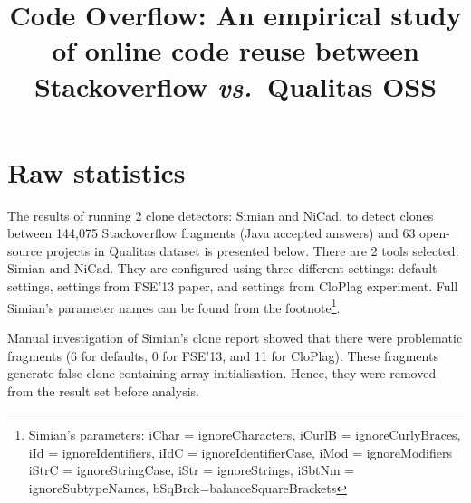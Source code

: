 \documentclass{IEEEtran}
\begin{document}
\onecolumn

\title{Code Overflow: An empirical study of online code reuse between Stackoverflow \textit{vs.~}Qualitas OSS}
\maketitle

\section*{Raw statistics}
The results of running 2 clone detectors: Simian and NiCad, to detect clones between 144,075 Stackoverflow fragments (Java accepted answers) and 63 open-source projects in Qualitas dataset is presented below. There are 2 tools selected: Simian and NiCad. They are configured using three different settings: default settings, settings from FSE'13 paper, and settings from CloPlag experiment. Full Simian's parameter names can be found from the footnote\footnote{Simian's parameters: iChar = ignoreCharacters, iCurlB = ignoreCurlyBraces, iId = ignoreIdentifiers, iIdC = ignoreIdentifierCase, iMod = ignoreModifiers \newline iStrC = ignoreStringCase, iStr = ignoreStrings, iSbtNm = ignoreSubtypeNames, bSqBrck=balanceSquareBrackets}.

Manual investigation of Simian's clone report showed that there were problematic fragments (6 for defaults, 0 for FSE'13, and 11 for CloPlag). These fragments generate false clone containing array initialisation. Hence, they were removed from the result set before analysis.
\end{document}
